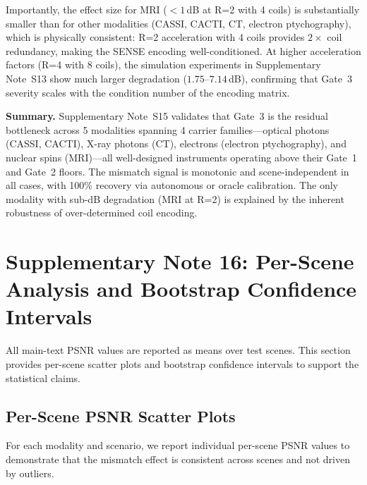 \documentclass[11pt]{article}
\theoremstyle{definition}
\begin{document}
Importantly, the effect size for MRI ($< 1$\,dB at R=2 with 4 coils) is substantially smaller than for other modalities (CASSI, CACTI, CT, electron ptychography), which is physically consistent: R=2 acceleration with 4 coils provides $2\times$ coil redundancy, making the SENSE encoding well-conditioned.
At higher acceleration factors (R=4 with 8 coils), the simulation experiments in Supplementary Note~S13 show much larger degradation ($1.75$--$7.14$\,dB), confirming that Gate~3 severity scales with the condition number of the encoding matrix.

\vspace{1em}
\noindent\textbf{Summary.} Supplementary Note~S15 validates that Gate~3 is the residual bottleneck across 5 modalities spanning 4 carrier families---optical photons (CASSI, CACTI), X-ray photons (CT), electrons (electron ptychography), and nuclear spins (MRI)---all well-designed instruments operating above their Gate~1 and Gate~2 floors. The mismatch signal is monotonic and scene-independent in all cases, with 100\% recovery via autonomous or oracle calibration. The only modality with sub-dB degradation (MRI at R=2) is explained by the inherent robustness of over-determined coil encoding.


\section{Supplementary Note 16: Per-Scene Analysis and Bootstrap Confidence Intervals}
\label{sec:perscene}

All main-text PSNR values are reported as means over test scenes. This section provides per-scene scatter plots and bootstrap confidence intervals to support the statistical claims.

\subsection{Per-Scene PSNR Scatter Plots}

For each modality and scenario, we report individual per-scene PSNR values to demonstrate that the mismatch effect is consistent across scenes and not driven by outliers.
\end{document}
